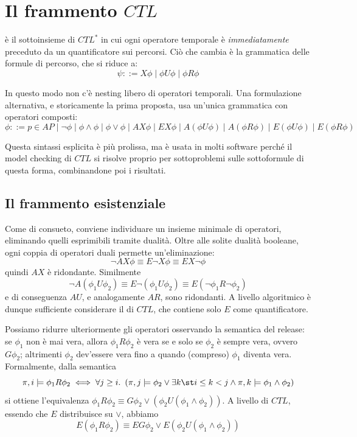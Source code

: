 \section{Il frammento \(CTL\)}

 è il sottoinsieme di \(CTL^*\) in cui ogni operatore temporale è \emph{immediatamente} preceduto da un quantificatore sui percorsi. Ciò che cambia è la grammatica delle formule di percorso, che si riduce a:
\[\psi ::= X\phi \mid \phi U\phi \mid \phi R\phi\]

In questo modo non c'è nesting libero di operatori temporali. Una formulazione alternativa, e storicamente la prima proposta, usa un'unica grammatica con operatori composti:
\[\phi ::= p \in AP \mid \neg \phi \mid \phi \land \phi \mid \phi \lor \phi \mid AX\phi \mid EX\phi \mid A(\phi U \phi) \mid A(\phi R \phi) \mid E(\phi U \phi) \mid E(\phi R \phi)\]

Questa sintassi esplicita è più prolissa, ma è usata in molti software perché il model checking di \(CTL\) si risolve proprio per sottoproblemi sulle sottoformule di questa forma, combinandone poi i risultati.

\subsection{Il frammento esistenziale}

Come di consueto, conviene individuare un insieme minimale di operatori, eliminando quelli esprimibili tramite dualità. Oltre alle solite dualità booleane, ogni coppia di operatori duali permette un'eliminazione:
\[\neg AX\phi \equiv E\neg X \phi \equiv EX \neg \phi\]
quindi \(AX\) è ridondante. Similmente
\[\neg A (\phi_1 U \phi_2) \equiv E \neg (\phi_1 U \phi_2) \equiv E (\neg \phi_1 R \neg \phi_2)\]
e di conseguenza \(AU\), e analogamente \(AR\), sono ridondanti. A livello algoritmico è dunque sufficiente considerare il  di \(CTL\), che contiene solo \(E\) come quantificatore.

Possiamo ridurre ulteriormente gli operatori osservando la semantica del release: se \(\phi_1\) non è mai vera, allora \(\phi_1 R \phi_2\) è vera se e solo se \(\phi_2\) è sempre vera, ovvero \(G\phi_2\); altrimenti \(\phi_2\) dev'essere vera fino a quando (compreso) \(\phi_1\) diventa vera. Formalmente, dalla semantica
\[\pi, i \models \phi_1 R \phi_2 \iff \forall j \geq i.\ \left(\pi, j \models \phi_2 \lor \exists k\st i \leq k < j \land \pi, k \models \phi_1 \land \phi_2\right)\]
si ottiene l'equivalenza \(\phi_1 R \phi_2 \equiv G \phi_2 \lor (\phi_2 U (\phi_1 \land \phi_2))\). A livello di \(CTL\), essendo che \(E\) distribuisce su \(\lor\), abbiamo
\[E (\phi_1 R \phi_2) \equiv E G\phi_2 \lor E (\phi_2 U(\phi_1 \land \phi_2))\]

